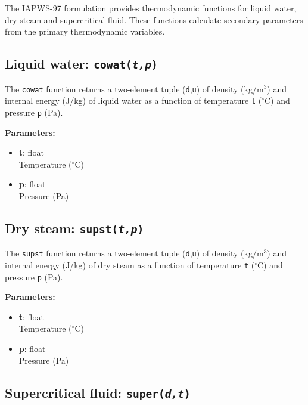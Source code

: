 The IAPWS-97 formulation provides thermodynamic functions for liquid water, dry steam and supercritical fluid.  These functions calculate secondary parameters from the primary thermodynamic variables.

\begin{snugshade}
\subsection{Liquid water: \texttt{cowat(\emph{t,p})}}
\end{snugshade}
\label{sec:iapws97:cowat}

The \texttt{cowat} function returns a two-element tuple (\texttt{d},\texttt{u}) of density (kg/m$^3$) and internal energy (J/kg) of liquid water as a function of temperature \texttt{t} ($^{\circ}$C) and pressure \texttt{p} (Pa).

\textbf{Parameters:}
\begin{itemize}
\item \textbf{t}: float\\
  Temperature ($^{\circ}$C)
\item \textbf{p}: float\\
  Pressure (Pa)
\end{itemize}

\begin{snugshade}
\subsection{Dry steam: \texttt{supst(\emph{t,p})}}
\end{snugshade}
\label{sec:iapws97:supst}

The \texttt{supst} function returns a two-element tuple (\texttt{d},\texttt{u}) of density (kg/m$^3$) and internal energy (J/kg) of dry steam as a function of temperature \texttt{t} ($^{\circ}$C) and pressure \texttt{p} (Pa).

\textbf{Parameters:}
\begin{itemize}
\item \textbf{t}: float\\
  Temperature ($^{\circ}$C)
\item \textbf{p}: float\\
  Pressure (Pa)
\end{itemize}

\begin{snugshade}
\subsection{Supercritical fluid: \texttt{super(\emph{d,t})}}
\end{snugshade}
\label{sec:iapws97:super}

